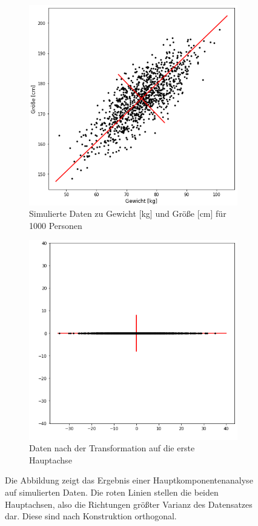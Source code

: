 \begin{figure}
\centering
	\begin{subfigure}{0.45\textwidth}
	\centering
	\includegraphics[width = .95\textwidth]{figures/pca_example.png}
	\caption{Simulierte Daten zu Gewicht [kg] und Größe [cm] für 1000 Personen}
	\label{pca_example_original}
	\end{subfigure}
	\begin{subfigure}{0.45\textwidth}
	\centering
	\includegraphics[width = .95\textwidth]{figures/pca_example_rotated.png}
	\caption{Daten nach der Transformation auf die erste Hauptachse}
	\label{pca_example_rotated}
	\end{subfigure}
\caption{Die Abbildung zeigt das Ergebnis einer Hauptkomponentenanalyse auf simulierten Daten. Die roten Linien stellen die beiden Hauptachsen, also die Richtungen größter Varianz des Datensatzes dar. Diese sind nach Konstruktion orthogonal.}
\label{pca_example}
\end{figure}

